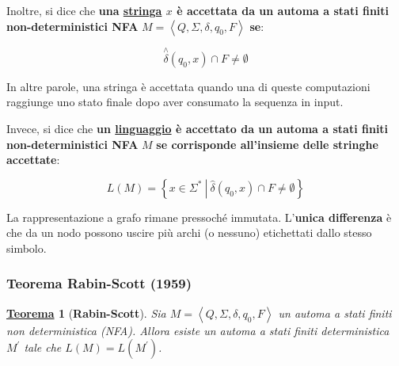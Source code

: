 \documentclass[a4paper]{article}
\newtheorem{theorem}{\textcolor{Red3}{\underline{Teorema}}}
\begin{document}
	\noindent
	Inoltre, si dice che \textcolor{Red3}{\textbf{una \underline{stringa} $x$ è accettata da un automa a stati finiti non-deterministici NFA}} $M = \left\langle Q, \Sigma, \delta, q_{0}, F\right\rangle$ \textbf{se}:
	
	\begin{equation*}
		\overset{\wedge}{\delta} \left(q_{0}, x\right) \cap F \ne \emptyset
	\end{equation*}

	\noindent
	In altre parole, una stringa è accettata quando una di queste computazioni raggiunge uno stato finale dopo aver consumato la sequenza in input.

	Invece, si dice che \textcolor{Red3}{\textbf{un \underline{linguaggio} è accettato da un automa a stati finiti non-deterministici NFA}} $M$ \textbf{se corrisponde all'insieme delle stringhe accettate}:
	
	\begin{equation*}
		L\left(M\right) = \left\{x \in \Sigma^{*} \: \left| \: \hat{\delta} \left(q_{0}, x\right) \cap F \ne \emptyset\right.\right\}
	\end{equation*}

	La rappresentazione a grafo rimane pressoché immutata. L'\textbf{unica differenza} è che da un nodo possono uscire più archi (o nessuno) etichettati dallo stesso simbolo.
	
	\newpage
	
	\subsubsection{Teorema Rabin-Scott (1959)}
	
	\begin{theorem}[\textbf{Rabin-Scott}] \label{rabin-scott}
		Sia $M = \left\langle Q, \Sigma, \delta, q_{0}, F \right\rangle$ un automa a stati finiti non deterministica (NFA). Allora esiste un automa a stati finiti deterministica $M^{'}$ tale che $L\left(M\right) = L(M^{'})$.
	\end{theorem}
\end{document}
